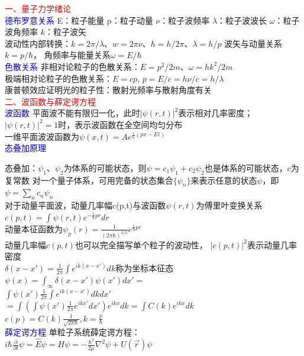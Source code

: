 \documentclass[a4paper,8pt]{extarticle} %
\newcommand{\bluetext}[1]{\textcolor{blue}{#1}}
\newcommand{\redtext}[1]{\textcolor{red}{#1}}
\begin{document}
\begin{multicols}{3}

\redtext{一、量子力学绪论}\\
\bluetext{德布罗意关系}
E：粒子能量 p：粒子动量 $\nu$：粒子波频率 $\lambda$：粒子波波长 $\omega$：粒子波角频率 $k$：粒子波矢\\
波动性内部转换：$k=2\pi/\lambda$、$w=2\pi\nu$、$\hbar=h/2\pi$、$\lambda=h/p$
波矢与动量关系$k=p/\hbar$，
角频率与能量关系$\omega=E/\hbar$ \\
\bluetext{色散关系}
非相对论粒子的色散关系：$E = p^2/2m$、$\omega=hk^2/2m$\\
极端相对论粒子的色散关系：$E = cp$,
$p=E/c=h\nu/c=h/\lambda$\\
康普顿效应证明光的粒子性：散射光频率与散射角度有关\\
\redtext{二、波函数与薛定谔方程}\\
\bluetext{波函数}
平面波不能有限归一化，此时$|\psi(r, t)|^2$表示相对几率密度；$|\psi(r, t)|^2 = 1$时，表示波函数在全空间均匀分布\\
一维平面波波函数为$\psi(x, t) = Ae^{\frac{i}{\hbar}(px-E t)}$\\
\bluetext{态叠加原理}

态叠加：$\psi_1、\psi_2$为体系的可能状态，则$\psi=c_1\psi_1+c_2\psi_2$也是体系的可能状态，c为复常数
对一个量子体系，可用完备的状态集合${\{\psi_n\}}$来表示任意的状态$\psi$，即$\psi=\sum_n c_n\psi_n$\\
对于动量平面波，动量几率幅c(p,t)与波函数$\psi(r,t)$为傅里叶变换关系$c(p,t)=\int\psi(r,t)e^{-\frac{i}{\hbar}pr}dr$\\
动量本征函数为$\psi_p(r)=\frac{1}{(2\pi\hbar)^{3/2}}e^{\frac{i}{\hbar}pr}$\\
动量几率幅$c(p,t)$也可以完全描写单个粒子的波动性， $|c(p,t)|^2$表示动量几率密度\\
$\delta(x-x')=\frac{1}{2\pi}\int e^{ik(x-x')}dk$称为坐标本征态\\
$\psi(x)=\int_\infty\delta(x-x')\psi(x')dx'= $ \\ $\int\psi(x')\frac{1}{2\pi}\int e^{ik(x-x')}dkdx'$\\
$ = \int(\int\psi(x')\frac{1}{2\pi}e^{ikx'}dx')e^{ikx}dk=\int C(k)e^{ikx}dk $\\
$c(p)=C(k)\frac{1}{\sqrt{2\pi\hbar}}, k=\frac{p}{\hbar}$\\
\bluetext{薛定谔方程}
单粒子系统薛定谔方程：\\$i\hbar\frac{\partial}{\partial t}\psi = \hat{E}\psi = H\psi = -\frac{\hbar^2}{2\mu}\nabla^2\psi + U(\vec{r})\psi$ 
 

\end{multicols}
\end{document}
